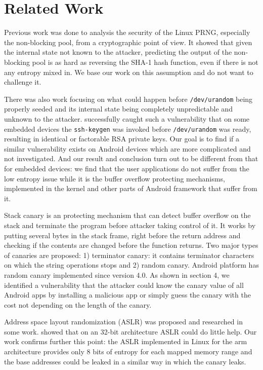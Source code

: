 \section{Related Work}


Previous work was done to analysis the security of the Linux PRNG, especially the non-blocking pool, from a cryptographic point of view\cite{Gutterman06}. It showed that given the internal state not known to the attacker, predicting the output of the non-blocking pool is as hard as reversing the SHA-1 hash function, even if there is not any entropy mixed in. We base our work on this assumption and do not want to challenge it. 

There was also work focusing on what could happen before \verb|/dev/urandom| being properly seeded and its internal state being completely unpredictable and unknown to the attacker. \cite{weakkeys12} successfully caught such a vulnerability that on some embedded devices the \verb|ssh-keygen| was invoked before \verb|/dev/urandom| was ready, resulting in identical or factorable RSA private keys. Our goal is to find if a similar vulnerability exists on Android devices which are more complicated and not investigated. And our result and conclusion turn out to be different from that for embedded devices: we find that the user applications do not suffer from the low entropy issue while it is the buffer overflow protecting mechanisms, implemented in the kernel and other parts of Android framework that suffer from it.

Stack canary \cite{Cowan98} is an protecting mechanism that can detect buffer overflow on the stack and terminate the program before attacker taking control of it. It works by putting several bytes in the stack frame, right before the return address and checking if the contents are changed before the function returns. Two major types of canaries are proposed: 1) terminator canary: it contains terminator characters on which the string operations stops and 2) random canary. Android platform has random canary implemented since version 4.0. As shown in section 4, we identified a vulnerability that the attacker could know the canary value of all Android apps by installing a malicious app or simply guess the canary with the cost not depending on the length of the canary.

Address space layout randomization (ASLR) was proposed and researched in some work. \cite{Shacham04} showed that on an 32-bit architecture ASLR could do little help. Our work confirms further this point: the ASLR implemented in Linux for the arm architecture provides only 8 bits of entropy for each mapped memory range and the base addresses could be leaked in a similar way in which the canary leaks.


